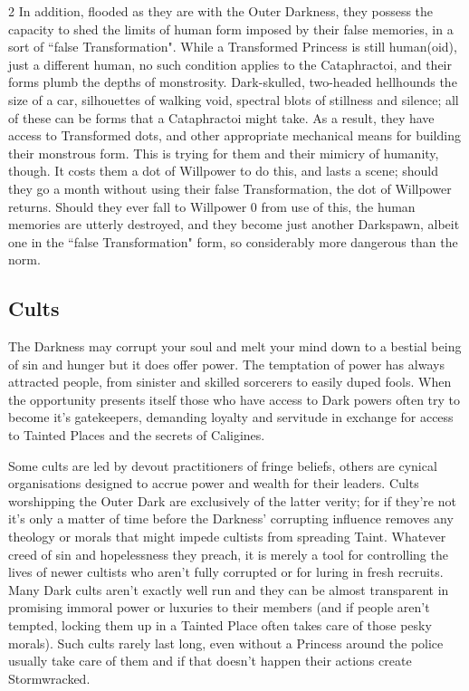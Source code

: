 \begin{multicols}{2}
In addition, flooded as they are with the Outer Darkness, they possess the capacity to shed the limits of human form imposed by their false memories, in a sort of \textquotedblleft false Transformation". While a Transformed Princess is still human(oid), just a different human, no such condition applies to the Cataphractoi, and their forms plumb the depths of monstrosity. Dark-skulled, two-headed hellhounds the size of a car, silhouettes of walking void, spectral blots of stillness and silence; all of these can be forms that a Cataphractoi might take. As a result, they have access to Transformed dots, and other appropriate mechanical means for building their monstrous form. This is trying for them and their mimicry of humanity, though. It costs them a dot of Willpower to do this, and lasts a scene; should they go a month without using their false Transformation, the dot of Willpower returns. Should they ever fall to Willpower 0 from use of this, the human memories are utterly destroyed, and they become just 
another Darkspawn, albeit one in the \textquotedblleft false Transformation" form, so considerably more dangerous than the norm. 

\subsection*{Cults}

The Darkness may corrupt your soul and melt your mind down to a bestial being of sin and hunger but it does offer power. The temptation of power has always attracted people, from sinister and skilled sorcerers to easily duped fools. When the opportunity presents itself those who have access to Dark powers often try to become it's gatekeepers, demanding loyalty and servitude in exchange for access to Tainted Places and the secrets of Caligines.

Some cults are led by devout practitioners of fringe beliefs, others are cynical organisations designed to accrue power and wealth for their leaders. Cults worshipping the Outer Dark are exclusively of the latter verity; for if they're not it's only a matter of time before the Darkness' corrupting influence removes any theology or morals that might impede cultists from spreading Taint. Whatever creed of sin and hopelessness they preach, it is merely a tool for controlling the lives of newer cultists who aren't fully corrupted or for luring in fresh recruits. Many Dark cults aren't exactly well run and they can be almost transparent in promising immoral power or luxuries to their members (and if people aren't tempted, locking them up in a Tainted Place often takes care of those pesky morals). Such cults rarely last long, even without a Princess around the police usually take care of them and if that doesn’t happen their actions create Stormwracked. 


\end{multicols}
